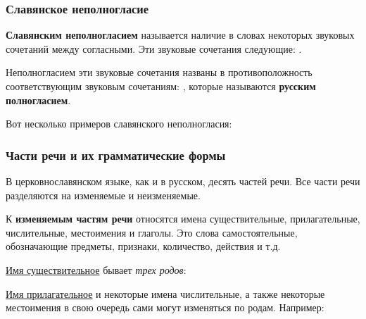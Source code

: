 \documentclass[11pt,a4paper,oneside]{memoir}
\begin{document}
                \subsubsection{Славянское неполногласие}

    \textbf{Славянским неполногласием} называется наличие в словах некоторых звуковых сочетаний между согласными. Эти звуковые сочетания следующие: {}.
    
    Неполногласием эти звуковые сочетания названы в противоположность соответствующим звуковым сочетаниям: {}, которые называются \textbf{русским полногласием}.
    
    Вот несколько примеров славянского неполногласия:

    \bigskip{}

                \subsubsection{Части речи и их грамматические формы}

    В церковнославянском языке, как и в русском, десять частей речи. Все части речи разделяются на изменяемые и неизменяемые.

    К \textbf{изменяемым частям речи} относятся имена существительные, прилагательные, числительные, местоимения и глаголы. Это слова самостоятельные, обозначающие предметы, признаки, количество, действия и т.д.

    \underline{Имя существительное} бывает \emph{трех родов}:

    \bigskip{}

    \underline{Имя прилагательное} и некоторые имена числительные, а также некоторые местоимения в свою очередь сами могут изменяться по родам. Например:

    \bigskip{}
\end{document}
